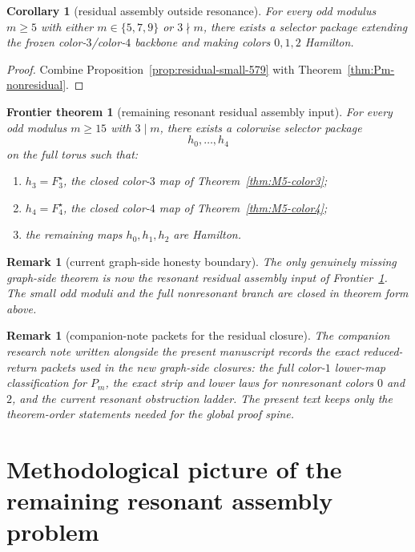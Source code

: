 \documentclass[11pt]{article}
\newtheorem{frontier}[theorem]{Frontier theorem}
\newtheorem{corollary}[theorem]{Corollary}
\newtheorem{remark}[theorem]{Remark}
\begin{document}
\begin{corollary}[residual assembly outside resonance]
\label{cor:residual-outside-resonance}
For every odd modulus $m\ge 5$ with either $m\in\{5,7,9\}$ or $3\nmid m$,
there exists a selector package extending the frozen color-$3$/color-$4$
backbone and making colors $0,1,2$ Hamilton.
\end{corollary}

\begin{proof}
Combine Proposition~\ref{prop:residual-small-579} with
Theorem~\ref{thm:Pm-nonresidual}.
\end{proof}

\begin{frontier}[remaining resonant residual assembly input]
\label{fr:resonant-residual-assembly}
\label{bg:five-color-assembly}
For every odd modulus $m\ge 15$ with $3\mid m$, there exists a colorwise
selector package
\[
h_0,\dots,h_4
\]
on the full torus such that:
\begin{enumerate}[label=\textup{(\arabic*)},leftmargin=2.8em]
\item $h_3=F_3^\star$, the closed color-$3$ map of
      Theorem~\ref{thm:M5-color3};
\item $h_4=F_4^\star$, the closed color-$4$ map of
      Theorem~\ref{thm:M5-color4};
\item the remaining maps $h_0,h_1,h_2$ are Hamilton.
\end{enumerate}
\end{frontier}

\begin{remark}[current graph-side honesty boundary]
The only genuinely missing graph-side theorem is now the resonant residual
assembly input of Frontier~\ref{fr:resonant-residual-assembly}.
The small odd moduli and the full nonresonant branch are closed in theorem
form above.
\end{remark}

\begin{remark}[companion-note packets for the residual closure]
The companion research note written alongside the present manuscript records the
exact reduced-return packets used in the new graph-side closures: the full
color-$1$ lower-map classification for $P_m$, the exact strip and lower laws
for nonresonant colors $0$ and $2$, and the current resonant obstruction
ladder.
The present text keeps only the theorem-order statements needed for the global
proof spine.
\end{remark}


\section{Methodological picture of the remaining resonant assembly problem}
\label{sec:methodological-picture}
\end{document}
